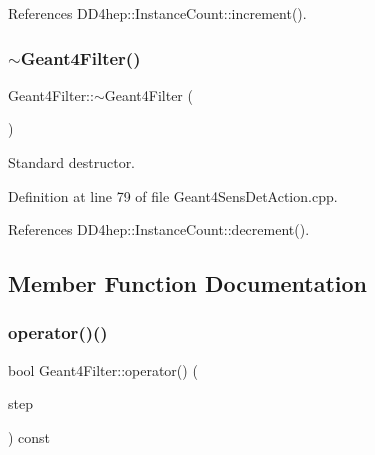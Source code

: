 References D\+D4hep\+::\+Instance\+Count\+::increment().

\hypertarget{class_d_d4hep_1_1_simulation_1_1_geant4_filter_a2fdb09d7018165b25034b37fa8eb9930}{}\label{class_d_d4hep_1_1_simulation_1_1_geant4_filter_a2fdb09d7018165b25034b37fa8eb9930} 
\subsubsection{\texorpdfstring{$\sim$\+Geant4\+Filter()}{~Geant4Filter()}}
{\footnotesize\ttfamily Geant4\+Filter\+::$\sim$\+Geant4\+Filter (\begin{DoxyParamCaption}{ }\end{DoxyParamCaption})\hspace{0.3cm}{\ttfamily [virtual]}}



Standard destructor. 



Definition at line 79 of file Geant4\+Sens\+Det\+Action.\+cpp.



References D\+D4hep\+::\+Instance\+Count\+::decrement().



\subsection{Member Function Documentation}
\hypertarget{class_d_d4hep_1_1_simulation_1_1_geant4_filter_a373f84ddcbefe180daa058050b6cf753}{}\label{class_d_d4hep_1_1_simulation_1_1_geant4_filter_a373f84ddcbefe180daa058050b6cf753} 
\subsubsection{\texorpdfstring{operator()()}{operator()()}}
{\footnotesize\ttfamily bool Geant4\+Filter\+::operator() (\begin{DoxyParamCaption}\item[{const G4\+Step $\ast$}]{step }\end{DoxyParamCaption}) const\hspace{0.3cm}{\ttfamily [virtual]}}



